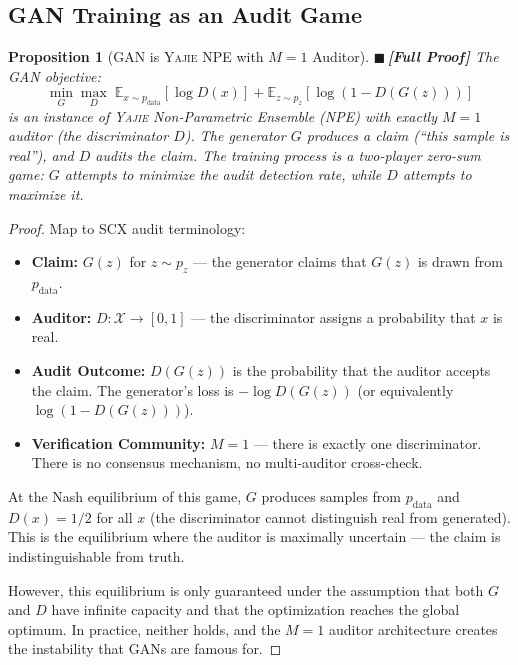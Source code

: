 \documentclass[12pt,a4paper]{article}
\newtheorem{proposition}[theorem]{Proposition}
\theoremstyle{definition}
\newcommand{\rigorFull}{{\color{rigorcolor}$\blacksquare$\,\textbf{[Full Proof]}}}
\newcommand{\Yajie}{\textsc{Yajie}}
\newcommand{\SCX}{\textsc{SCX}}
\newcommand{\E}{\mathbb{E}}
\newcommand{\cX}{\mathcal{X}}
\begin{document}
\subsection{GAN Training as an Audit Game}

\begin{proposition}[GAN is \Yajie{} NPE with $M=1$ Auditor]\label{prop:gan_yajie}
\rigorFull
The GAN objective:
\begin{equation}\label{eq:gan_objective}
    \min_G \max_D \; \E_{x \sim p_{\text{data}}}[\log D(x)] + \E_{z \sim p_z}[\log(1 - D(G(z)))]
\end{equation}
is an instance of \Yajie{} Non-Parametric Ensemble (NPE) with exactly $M=1$ auditor (the discriminator $D$). The generator $G$ produces a claim (``this sample is real''), and $D$ audits the claim. The training process is a two-player zero-sum game: $G$ attempts to minimize the audit detection rate, while $D$ attempts to maximize it.
\end{proposition}

\begin{proof}
Map to \SCX{} audit terminology:
\begin{itemize}[nosep]
    \item \textbf{Claim:} $G(z)$ for $z \sim p_z$ — the generator claims that $G(z)$ is drawn from $p_{\text{data}}$.
    \item \textbf{Auditor:} $D: \cX \to [0,1]$ — the discriminator assigns a probability that $x$ is real.
    \item \textbf{Audit Outcome:} $D(G(z))$ is the probability that the auditor accepts the claim. The generator's loss is $-\log D(G(z))$ (or equivalently $\log(1 - D(G(z)))$).
    \item \textbf{Verification Community:} $M=1$ — there is exactly one discriminator. There is no consensus mechanism, no multi-auditor cross-check.
\end{itemize}

At the Nash equilibrium of this game, $G$ produces samples from $p_{\text{data}}$ and $D(x) = 1/2$ for all $x$ (the discriminator cannot distinguish real from generated). This is the equilibrium where the auditor is maximally uncertain — the claim is indistinguishable from truth.

However, this equilibrium is only guaranteed under the assumption that both $G$ and $D$ have infinite capacity and that the optimization reaches the global optimum. In practice, neither holds, and the $M=1$ auditor architecture creates the instability that GANs are famous for.
\end{proof}
\end{document}
